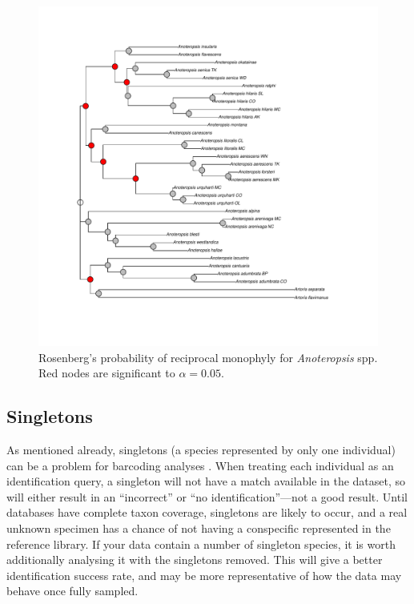 \documentclass{article}
\begin{document}
\begin{figure}[p]
	\centering
	\includegraphics[width=1\textwidth, trim=3cm 1cm 3cm 0cm]{rosenbergs}
	\caption{Rosenberg's probability of reciprocal monophyly for  \emph{Anoteropsis} spp. Red nodes are significant to $\alpha = 0.05$.}
	\label{rosenbergs.fig}
\end{figure}

\subsection{Singletons}

As mentioned already, singletons (a species represented by only one individual) can be a problem for barcoding analyses \citep{Lim2011}. When treating each individual as an identification query, a singleton will not have a match available in the dataset, so will either result in an ``incorrect'' or ``no identification''---not a good result. Until databases have complete taxon coverage, singletons are likely to occur, and a real unknown specimen has a chance of not having a conspecific represented in the reference library. If your data contain a number of singleton species, it is worth additionally analysing it with the singletons removed. This will give a better identification success rate, and may be more representative of how the data may behave once fully sampled.
\end{document}
